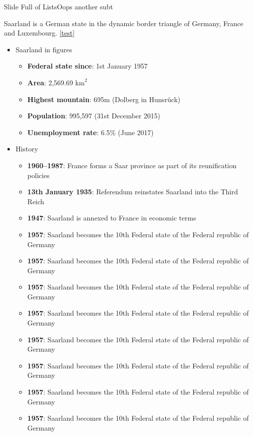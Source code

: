 \documentclass{corpborepres}
\begin{document}
	\begin{frame}[allowframebreaks]{Slide Full of Lists}{Oops another subt}


	Saarland is a German state in the dynamic border triangle of Germany, France and Luxembourg.
	\cref{test}
		\begin{itemize}
			\item Saarland in figures
				\begin{itemize}
					\item \textbf{Federal state since}: 1st January 1957
					\item \textbf{Area}: 2,569.69 $\text{km}^2$
					\item \textbf{Highest mountain}: 695m (Dolberg in Hunsrück)
					\item \textbf{Population}: 995,597 (31st December 2015)
					\item \textbf{Unemployment rate}: 6.5\% (June 2017)
				\end{itemize}
			\item History
				\begin{itemize}
					\item \textbf{1960--1987}: France forms a Saar province as part of its reunification policies
					\item \textbf{13th January 1935}: Referendum reinstates Saarland into the Third Reich
					\item \textbf{1947}: Saarland is annexed to France in economic terms
					\item \textbf{1957}: Saarland becomes the 10th Federal state of the Federal republic of Germany
					\item \textbf{1957}: Saarland becomes the 10th Federal state of the Federal republic of Germany
					\item \textbf{1957}: Saarland becomes the 10th Federal state of the Federal republic of Germany
					\item \textbf{1957}: Saarland becomes the 10th Federal state of the Federal republic of Germany
					\item \textbf{1957}: Saarland becomes the 10th Federal state of the Federal republic of Germany
					\item \textbf{1957}: Saarland becomes the 10th Federal state of the Federal republic of Germany
					\item \textbf{1957}: Saarland becomes the 10th Federal state of the Federal republic of Germany
					\item \textbf{1957}: Saarland becomes the 10th Federal state of the Federal republic of Germany

\end{itemize}
\end{itemize}
\end{frame}
\end{document}
